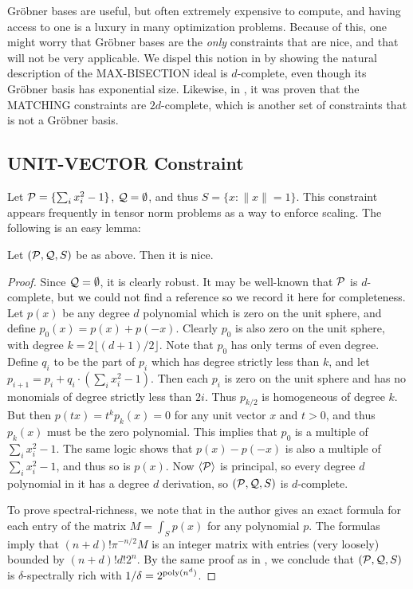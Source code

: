 Gr\"obner bases are useful, but often extremely expensive to compute, and having access to one is a luxury in many optimization problems. Because of this, one might worry that Gr\"obner bases are the \emph{only} constraints that are nice, and that  will not be very applicable. We dispel this notion in  by showing the natural description of the MAX-BISECTION ideal is $d$-complete, even though its Gr\"obner basis has exponential size. Likewise, in \cite{}, it was proven that the MATCHING constraints are $2d$-complete, which is another set of constraints that is not a Gr\"obner basis. 

\subsection{UNIT-VECTOR Constraint}
Let $\mathcal P = \{\sum_i x_i^2 - 1\}$, $\mathcal Q = \emptyset$, and thus $S = \{x: \|x\| = 1\}$. This constraint appears frequently in tensor norm problems as a way to enforce scaling. The following is an easy lemma:
\begin{lemma}
Let $(\mathcal P, \mathcal Q, S)$ be as above. Then it is nice. 
\end{lemma}
\begin{proof}
Since $\mathcal Q = \emptyset$, it is clearly robust. It may be well-known that $\mathcal P$ is $d$-complete, but we could not find a reference so we record it here for completeness. Let $p(x)$ be any degree $d$ polynomial which is zero on the unit sphere, and define $p_0(x) = p(x) + p(-x)$. Clearly $p_0$ is also zero on the unit sphere, with degree $k = 2\lfloor (d+1)/2 \rfloor$. Note that $p_0$ has only terms of even degree. Define $q_i$ to be the part of $p_i$ which has degree strictly less than $k$, and let $p_{i+1} = p_i + q_i\cdot(\sum_i x_i^2 - 1)$. Then each $p_i$ is zero on the unit sphere and has no monomials of degree strictly less than $2i$. Thus $p_{k/2}$ is homogeneous of degree $k$. But then $p(tx) = t^kp_k(x) = 0$ for any unit vector $x$ and $t > 0$, and thus $p_k(x)$ must be the zero polynomial. This implies that $p_0$ is a multiple of $\sum_i x_i^2 - 1$. The same logic shows that $p(x) - p(-x)$ is also a multiple of $\sum_i x_i^2 - 1$, and thus so is $p(x)$. Now $\langle \mathcal P\rangle$ is principal, so every degree $d$ polynomial in it has a degree $d$ derivation, so $(\mathcal P, \mathcal Q, S)$ is $d$-complete.

To prove spectral-richness, we note that in \cite{} the author gives an exact formula for each entry of the matrix $M = \int_{S} p(x)$ for any polynomial $p$. The formulas imply that $(n+d)!\pi^{-n/2} M$ is an integer matrix with entries (very loosely) bounded by $(n+d)!d!2^n$. By the same proof as in , we conclude that $(\mathcal P, \mathcal Q, S)$ is $\delta$-spectrally rich with $1/\delta = 2^{\operatorname{poly}(n^d)}$.
\end{proof}

